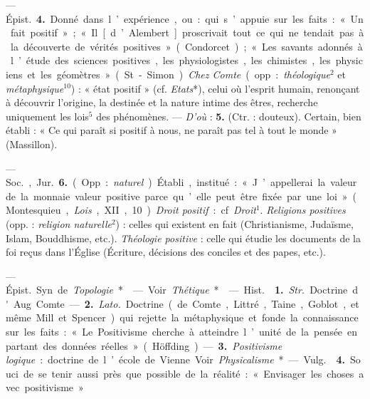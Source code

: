 \begin{itemize}[leftmargin=1cm, label=, itemsep=1pt]
— \si{Épist.} {\bf 4.} Donné dans l’expérience, ou : qui s’appuie sur les
faits : « Un fait positif » ; « Il [d’Alembert] proscrivait tout ce qui ne
tendait pas à la découverte de vérités positives » (Condorcet) ; « Les
savants adonnés à l’étude des sciences positives, les physiologistes, les
chimistes, les physiciens et les géomètres » (St-Simon). {\it Chez Comte}
(opp. : {\it théologique}$^2$ et {\it métaphysique}$^{10}$) : « état positif
» (cf. {\it Etats}*), celui où l’esprit humain, renonçant à découvrir
l’origine, la destinée et la nature intime des êtres, recherche uniquement
les lois$^5$ des phénomènes. — {\it D'où} : {\bf 5.} (Ctr. : douteux).
Certain, bien établi : « Ce qui paraît si positif à nous, ne paraît pas tel à
tout le monde » (Massillon).

— \si{Soc.}, \si{Jur.} {\bf 6.} (Opp. : {\it naturel}). Établi, institué : «
J’appellerai la valeur de la monnaie valeur positive parce qu’elle peut être
fixée par une loi » (Montesquieu, {\it Lois}, XII, 10). {\it Droit positif} :
cf. {\it Droit}$^1$. {\it Religions positives} (opp. : {\it religion
naturelle}$^2$) : celles qui existent en fait (Christianisme, Judaïsme,
Islam, Bouddhisme, etc.). {\it Théologie positive} : celle qui étudie les
documents de la foi reçus dans l’Église (Écriture, décisions des conciles et
des papes, etc.).

 — \si{Épist.} Syn. de {\it Topologie}*.

 — Voir {\it Thétique}*.

 — \si{Hist.}  {\bf 1.} {\it Str.} Doctrine d'Aug. Comte. —
{\bf 2.} {\it Lato.} Doctrine (de Comte, Littré, Taine, Goblot, et même Mill
et Spencer) qui rejette la métaphysique et fonde la connaissance sur les
faits : « Le Positivisme cherche à atteindre l’unité de la pensée en partant
des données réelles » (Höffding). —  {\bf 3.} {\it Positivisme logique} :
doctrine de l’école de Vienne. Voir {\it Physicalisme}*

— \si{Vulg.}  {\bf 4.} Souci de se tenir aussi près que possible de la
réalité : « Envisager les choses avec positivisme. »


\end{itemize}
